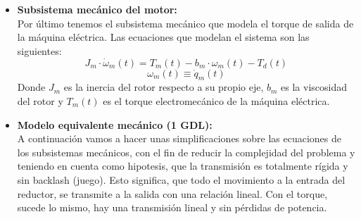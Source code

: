 \documentclass[10pt]{article}
\begin{document}
\begin{itemize}
	\item \textbf{Subsistema mecánico del motor:}\vspace{0.3cm}\\
	Por último tenemos el subsistema mecánico que modela el torque de salida de la máquina eléctrica. Las ecuaciones que modelan el sistema son las siguientes:
	\begin{equation}
		\label{eqn:sistMecanicoMotor}
		J_{m}\cdot \dot{\omega }_{m}\left ( t \right )=T_{m}\left ( t \right )-b_{m}\cdot \omega_{m}\left ( t \right )-T_{d}\left ( t \right )
	\end{equation}
	\begin{equation}
		\omega_{m}\left ( t \right )\equiv \dot{q}_{m}\left ( t \right )
	\end{equation}
	Donde $J_{m}$ es la inercia del rotor respecto a su propio eje, $b_{m}$ es la viscosidad del rotor y $T_{m}(t)$ es el torque electromecánico de la máquina eléctrica.

	\item \textbf{Modelo equivalente mecánico (1 GDL):}\vspace{0.3cm}\\
	A continuación vamos a hacer unas simplificaciones sobre las ecuaciones de los subsistemas mecánicos, con el fin de reducir la complejidad del problema y teniendo en cuenta como hipotesis, que la transmisión es totalmente rígida y sin backlash (juego).
	Esto significa, que todo el movimiento a la entrada del reductor, se transmite a la salida con una relación lineal. Con el torque, sucede lo mismo, hay una transmisión lineal y sin pérdidas de potencia.


\end{itemize}
\end{document}
